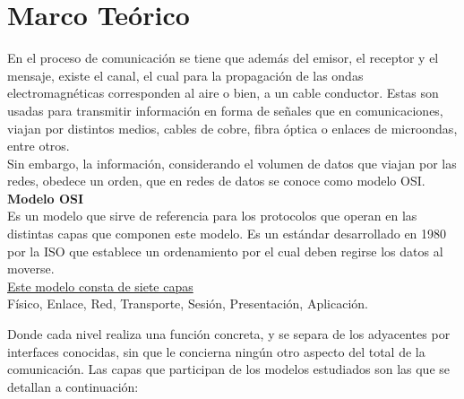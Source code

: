 \chapter{Marco Teórico}

En el proceso de comunicación se tiene que además del emisor, el receptor y el mensaje, existe el canal, el cual para la propagación de las ondas electromagnéticas corresponden al aire o bien, a un cable conductor. Estas son usadas para transmitir información en forma de señales que en comunicaciones, viajan por distintos medios, cables de cobre, fibra óptica o enlaces de microondas, entre otros.\\

Sin embargo, la información, considerando el volumen de datos que viajan por las redes, obedece un orden, que en redes de datos se conoce como modelo OSI.\\

\newpage
\textbf{Modelo OSI}\\

Es un modelo que sirve de referencia para los protocolos que operan en las distintas capas que componen este modelo. Es un estándar desarrollado en 1980 por la ISO que establece un ordenamiento por el cual deben regirse los datos al moverse.\\

\underline{Este modelo consta de siete capas}\\

Físico, Enlace, Red, Transporte, Sesión, Presentación, Aplicación.

Donde cada nivel realiza una función concreta, y se separa de los adyacentes por interfaces conocidas, sin que le concierna ningún otro aspecto del total de la comunicación.  Las capas que participan de los modelos estudiados son las que se detallan a continuación:

